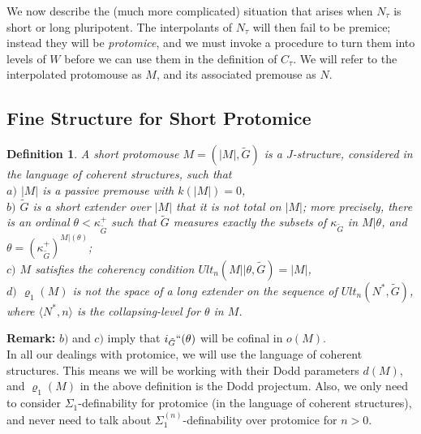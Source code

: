 \documentclass[12pt]{article}
\newtheorem{defn}[thm]{Definition}
\begin{document}
We now describe the (much more complicated) situation that arises when $N_\tau$ is short or long pluripotent.  The interpolants of $N_\tau$ will then  fail to be premice; instead they will be \textit{protomice}, and we must invoke a procedure to turn them into levels of $W$ before we can use them in the definition of $C_\tau$.  We will refer to the interpolated protomouse as $M$, and its associated premouse as $N$. \\

\subsection{Fine Structure for Short Protomice}

\begin{defn} \label{short protomouse}
A short protomouse $M = (| M |, \tilde{G})$ is a $J$-structure, considered in the language of coherent structures, such that\\

$a)$ $| M |$ is a passive premouse with $k( |M|) = 0$,\\

 $b)$ $\tilde{G}$ is a short extender over $|M|$ that it is not total on $|M|$; more precisely, there is an ordinal $\theta < \kappa_{\tilde{G}}^+$ such that $\tilde{G}$ measures exactly the subsets of $\kappa_{\tilde{G}}$ in $M | \theta$, and $\theta = (\kappa_{\tilde{G}}^+)^{M| (\theta)}$;\\
 
 $c)$ $M$ satisfies the coherency condition $Ult_n ( M || \theta , \tilde{G} ) = |M|$,\\
 
 
  $d)$ $\varrho_1 (M)$ is not the space of a long extender on the sequence of $Ult_n(N^* , \tilde{G})$, where $\langle N^* , n \rangle$ is the collapsing-level for $\theta$ in $M$.\\
\end{defn}

\bigskip

\textbf{Remark:} $b)$ and $c)$ imply that $i_{\tilde{G}}``(\theta)$ will be cofinal in $o(M)$.\\

In all our dealings with protomice, we will use the language of coherent structures.  This means we will be working with their Dodd parameters $d(M)$, and $\varrho_1(M)$ in the above definition is the Dodd projectum. Also, we only need to consider $\Sigma_1$-definability for protomice (in the language of coherent structures), and never need to talk about $\Sigma_1^{(n)}$-definability over protomice for $n > 0$.\\
\end{document}
